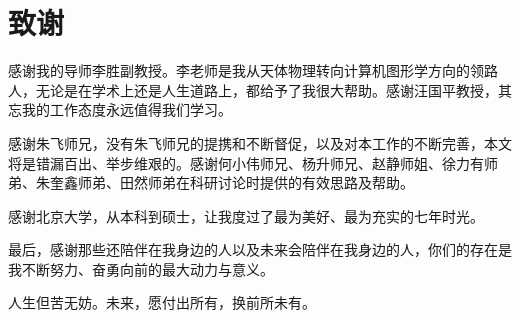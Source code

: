 \chapter{致谢}
感谢我的导师李胜副教授。李老师是我从天体物理转向计算机图形学方向的领路人，无论是在学术上还是人生道路上，都给予了我很大帮助。感谢汪国平教授，其忘我的工作态度永远值得我们学习。

感谢朱飞师兄，没有朱飞师兄的提携和不断督促，以及对本工作的不断完善，本文将是错漏百出、举步维艰的。感谢何小伟师兄、杨升师兄、赵静师姐、徐力有师弟、朱奎鑫师弟、田然师弟在科研讨论时提供的有效思路及帮助。

感谢北京大学，从本科到硕士，让我度过了最为美好、最为充实的七年时光。

最后，感谢那些还陪伴在我身边的人以及未来会陪伴在我身边的人，你们的存在是我不断努力、奋勇向前的最大动力与意义。

人生但苦无妨。未来，愿付出所有，换前所未有。
